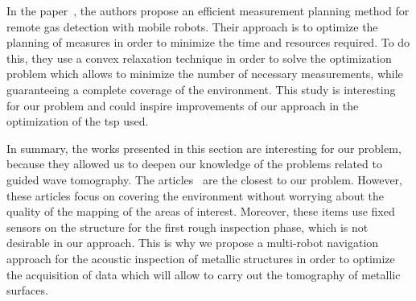 In the paper~\cite{7139673}, the authors propose an efficient measurement planning method for remote gas detection with mobile robots.
Their approach is to optimize the planning of measures in order to minimize the time and resources required.
To do this, they use a convex relaxation technique in order to solve the optimization problem which allows to minimize the number of necessary measurements, while guaranteeing a complete coverage of the environment.
This study is interesting for our problem and could inspire improvements of our approach in the optimization of the \gls{tsp} used.

In summary, the works presented in this section are interesting for our problem, because they allowed us to deepen our knowledge of the problems related to guided wave tomography.
The articles~\cite{7487624, 7139673} are the closest to our problem.
However, these articles focus on covering the environment without worrying about the quality of the mapping of the areas of interest.
Moreover, these items use fixed sensors on the structure for the first rough inspection phase, which is not desirable in our approach.
This is why we propose a multi-robot navigation approach for the acoustic inspection of metallic structures in order to optimize the acquisition of data which will allow to carry out the tomography of metallic surfaces.

